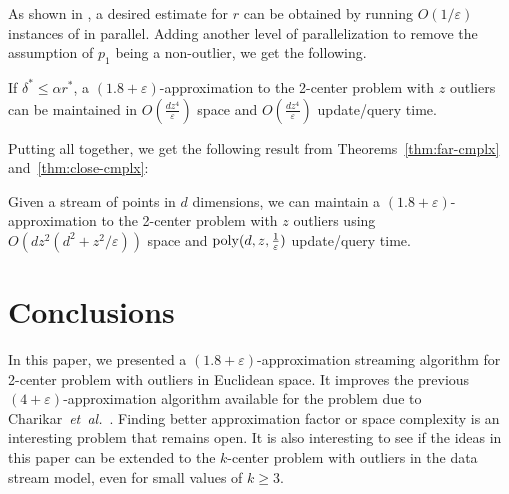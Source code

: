 \documentclass[envcountsame]{cls/cccg15}
\renewcommand{\O}{\ensuremath{{O}}}
\newcommand{\poly}{\mathop{\mathrm{poly}}}
\newcommand{\lee}{\leqslant}
\newcommand{\gee}{\geqslant}
\renewcommand{\leq}{\lee}
\renewcommand{\ge}{\gee}
\newcommand{\eps}{\varepsilon}
\newcommand{\etal}{{\em et~al.\/}}
\begin{document}

\noindent
As shown in , a desired estimate for $r$ can be
obtained by running $O(1/\eps)$ instances of  in parallel.
Adding another level of parallelization to remove the assumption of $p_1$
being a non-outlier, we get the following.

\begin{theorem}
\label{thm:close-cmplx}
	If $\delta^* \leq \alpha r^*$, a $(1.8 + \eps)$-approximation to the 2-center problem with $z$ outliers 
	can be maintained in $\O(\frac{dz^4}{\eps})$ space 
	and $\O(\frac{dz^4}{\eps})$ update/query time.
\end{theorem}


\noindent
Putting all together, we get the following result
from Theorems~\ref{thm:far-cmplx} and~\ref{thm:close-cmplx}:

\begin{theorem} \label{thm:1-center-stream}
	Given a stream of points in $d$ dimensions,
	we can maintain a $(1.8 + \eps)$-approximation to 
	the 2-center problem with $z$ outliers using 
	$\O(dz^2 (d^2 + z^2/\eps))$ space and 
	$\poly(d, z, {1 \over \eps})$ update/query time.
\end{theorem}


%


\section{Conclusions}
\label{sec:conc}

In this paper, we presented a $(1.8 + \eps)$-approximation streaming algorithm for 2-center problem with outliers in Euclidean space.
It improves the previous $(4+\eps)$-approximation algorithm available for the problem 
due to Charikar~\etal~\cite{mccutchen2008streaming}. 
Finding better approximation factor or space complexity
is an interesting problem that remains open.
It is also interesting to see if the ideas in this paper 
can be extended to the $k$-center problem with outliers in the data stream model,
even for small values of $k \ge 3$.
\end{document}
